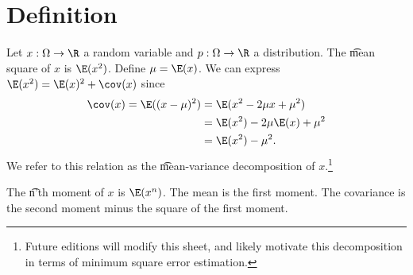 
\section*{Definition}

Let $x: \Omega  \to \R $ a random variable and $p: \Omega  \to \R $ a distribution.
The \t{mean square} of $x$ is $\E (x^2)$.
Define $\mu  = \E (x)$.
We can express $\E (x^2) = \E (x)^2 + \cov(x)$ since
\[
\begin{aligned}
\cov(x) = \E ((x -\mu )^2)
&= \E (x^2 - 2\mu x + \mu ^2) \\
&= \E (x^2) -2\mu \E (x) + \mu ^2 \\
&= \E (x^2) - \mu ^2.
\end{aligned}
\]
We refer to this relation as the \t{mean-variance decomposition} of $x$.\footnote{Future editions will modify this sheet, and likely motivate this decomposition in terms of minimum square error estimation.}

The \t{n'th moment} of $x$ is $\E (x^n)$.
The mean is the first moment.
The covariance is the second moment minus the square of the first moment.

\blankpage
